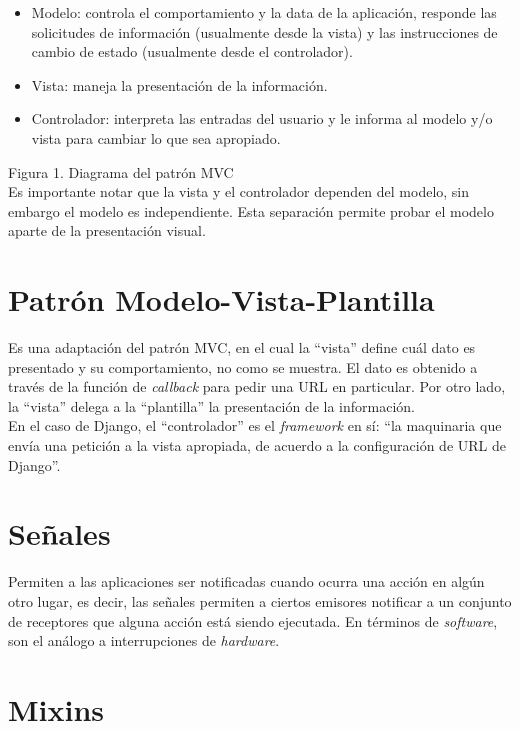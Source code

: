 \begin{itemize}
    \item Modelo: controla el comportamiento y la data de la aplicación, responde las solicitudes de información (usualmente desde la vista) y las instrucciones de cambio de estado (usualmente desde el controlador).
    \item Vista: maneja la presentación de la información.
    \item Controlador: interpreta las entradas del usuario y le informa al modelo y/o vista para cambiar lo que sea apropiado.\cite{MVC1}
\end{itemize}



Figura 1. Diagrama del patrón MVC\\

Es importante notar que la vista y el controlador dependen del modelo, sin embargo el modelo es independiente. Esta separación permite probar el modelo aparte de la presentación visual.

\section{Patrón Modelo-Vista-Plantilla}

Es una adaptación del patrón MVC, en el cual la “vista” define cuál dato es presentado y su comportamiento, no como se muestra. El dato es obtenido a través de la función de \textit{callback} para pedir una URL en particular. Por otro lado, la “vista” delega a la “plantilla”  la presentación de la información.\\

En el caso de Django, el “controlador” es el \textit{framework} en sí: “la maquinaria que envía una petición a la vista apropiada, de acuerdo a la configuración de URL de Django”. \cite{MVT}

\section{Señales}

Permiten a las aplicaciones ser notificadas cuando ocurra una acción en algún otro lugar, es decir, las señales permiten a ciertos emisores notificar a un conjunto de receptores que alguna acción está siendo ejecutada. \cite{Signals} En términos de \textit{software}, son el análogo a interrupciones de \textit{hardware}. \cite{Senales}

\section{Mixins}

